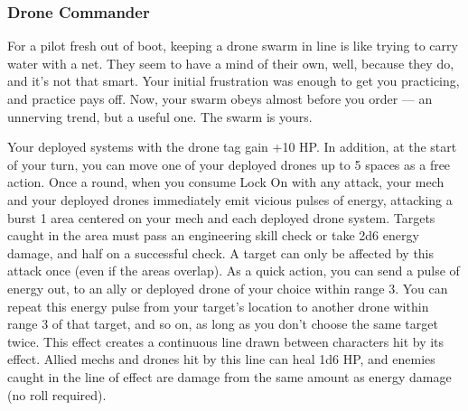 \subsubsection{Drone Commander}

\begin{talent}
{For a pilot fresh out of boot, keeping a drone swarm in line is like trying to carry water with a net. They seem to have a mind of their own, well, because they do, and it’s not that smart. Your initial frustration was enough to get you practicing, and practice pays off. Now, your swarm obeys almost before you order — an unnerving trend, but a useful one. The swarm is yours.}

Your deployed systems with the drone tag gain +10 HP. In addition, at the start of your turn, you can move one of your deployed drones up to 5 spaces as a free action.
Once a round, when you consume Lock On with any attack, your mech and your deployed drones immediately emit vicious pulses of energy, attacking a burst 1 area centered on your mech and each deployed drone system. Targets caught in the area must pass an engineering skill check or take 2d6 energy damage, and half on a successful check. A target can only be affected by this attack once (even if the areas overlap). 
As a quick action, you can send a pulse of energy out, to an ally or deployed drone of your choice within range 3. You can repeat this energy pulse from your target’s location to another drone within range 3 of that target, and so on, as long as you don’t choose the same target twice. This effect creates a continuous line drawn between characters hit by its effect. Allied mechs and drones hit by this line can heal 1d6 HP, and enemies caught in the line of effect are damage from the same amount as energy damage (no roll required).
\end{talent}